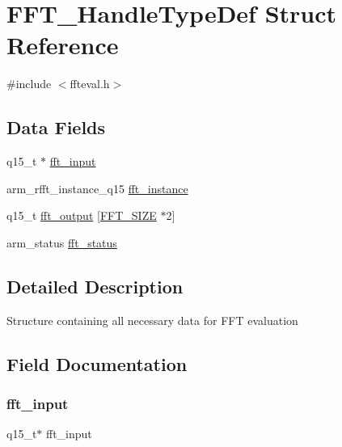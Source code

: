 \hypertarget{struct_f_f_t___handle_type_def}{}\section{F\+F\+T\+\_\+\+Handle\+Type\+Def Struct Reference}
\label{struct_f_f_t___handle_type_def}


{\ttfamily \#include $<$ffteval.\+h$>$}

\subsection*{Data Fields}
\begin{DoxyCompactItemize}
\item 
q15\+\_\+t $\ast$ \mbox{\hyperlink{struct_f_f_t___handle_type_def_a24274da1b2fa0789d9f7f8c31f7ee6d5}{fft\+\_\+input}}
\item 
arm\+\_\+rfft\+\_\+instance\+\_\+q15 \mbox{\hyperlink{struct_f_f_t___handle_type_def_a64ff6ded404718f6b0734ec3cb38c3a4}{fft\+\_\+instance}}
\item 
q15\+\_\+t \mbox{\hyperlink{struct_f_f_t___handle_type_def_a4df5ed415a14ec57648a1be3631fa492}{fft\+\_\+output}} \mbox{[}\mbox{\hyperlink{ffteval_8h_a636ddc19af00bc87969a07c88331f105}{F\+F\+T\+\_\+\+S\+I\+ZE}} $\ast$2\mbox{]}
\item 
arm\+\_\+status \mbox{\hyperlink{struct_f_f_t___handle_type_def_ab9552d91d6391e1b36e767bf5c127bb8}{fft\+\_\+status}}
\end{DoxyCompactItemize}


\subsection{Detailed Description}
Structure containing all necessary data for F\+FT evaluation 

\subsection{Field Documentation}
\mbox{\label{struct_f_f_t___handle_type_def_a24274da1b2fa0789d9f7f8c31f7ee6d5}} 
\subsubsection{\texorpdfstring{fft\_input}{fft\_input}}
{\footnotesize\ttfamily q15\+\_\+t$\ast$ fft\+\_\+input}

